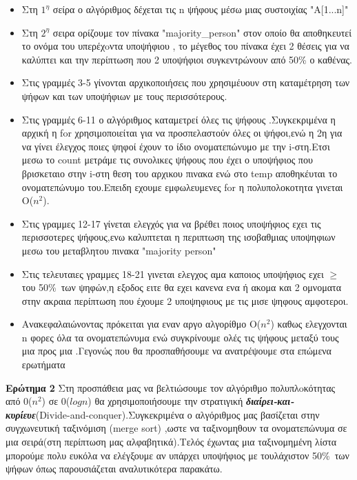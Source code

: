 \documentclass[a4paper, fleqn]{article}
\begin{document}
\begin{itemize}
    \item Στη $1^η$ σείρα ο αλγόριθμος δέχεται τις n ψήφους μέσω μιας συστοιχίας "A[1...n]"

    \item Στη $2^η$ σειρα ορίζουμε τον πίνακα "majority\_person" στον οποίο θα αποθηκευτεί  το ονόμα του υπερέχoντα υποψήφιου , το μέγεθος του πίνακα έχει 2 θέσεις για να καλύπτει και την περίπτωση που 2 υποψήφιοι συγκεντρώνουν από 50\% ο καθένας.

    \item Στις γραμμές 3-5 γίνονται αρχικοποιήσεις που χρησιμέυουν στη καταμέτρηση των ψήφων και των υποψήφιων με τους περισσότερους.

    \item Στις γραμμές 6-11 ο αλγόριθμος καταμετρεί όλες τις ψήφους .Συγκεκριμένα η αρχική η for χρησιμοποιείται για να προσπελαστούν όλες οι ψήφοι,ενώ η 2η για να γίνει έλεγχος ποιες ψηφοί έχουν το ίδιο ονοματεπώνυμο με την i-στη.Ετσι μεσω το count μετράμε τις συνολικες ψήφους που έχει ο υποψήφιος που βρισκεταιο στην i-στη θεση του αρχικου πινακα ενώ στο temp αποθηκέυται το ονοματεπώνυμο του.Eπειδη εχουμε εμφωλευμενες for η πολυπολοκοτητα γινεται Ο($n^2$).   

    \item Στις γραμμες 12-17 γίνεται  ελεγχός για να βρέθει  ποιος υποψήφιος εχει τις περισσοτερες ψήφους,ενω καλυπτεται η περιπτωση της ισοβαθμιας υποψηφιων μεσω του μεταβλητου πινακα "majority person"

    \item Στις τελευταιες γραμμες 18-21 γινεται ελεγχος αμα καποιος υποψήφιος εχει $\geq$ του 50\%\ των ψηφών,η εξοδος ειτε θα εχει κανενα ενα ή ακομα και 2 ομνοματα στην ακραια περίπτωση που έχουμε 2 υποψηφιους με τις μισε ψηφους αμφοτεροι.

    \item Aνακεφαλαιώνοντας πρόκειται για εναν αργο αλγορίθμο Ο($n^2$) καθως ελεγχονται n φορες όλα τα ονοματεπώνυμα ενώ συγκρίνουμε ολές τις ψήφους μεταξύ τους μια προς μια .Γεγονώς που θα προσπαθήσουμε να ανατρέψουμε στα επώμενα ερωτήματα   
\end{itemize}
\newpage

\textbf{
\color{red}Ερώτημα 2}
Στη προσπάθεια μας να βελτιώσουμε τον αλγόριθμο πολυπλoκότητας από 0($n^2$) σε 0($logn$) θα χρησιμοποιήσουμε την στρατιγική \textit{\textbf{διαίρει-και-κυρίευε}}(Divide-and-conquer).Συγκεκριμένα ο αλγόριθμος  μας βασίζεται στην συγχωνευτική ταξινόμιση (merge sort) ,ωστε να ταξινομηθουν τα ονοματεπώνυμα σε μια σειρά(στη περίπτωση μας αλφαβητικά).Τελός έχωντας μια ταξινομημένη λίστα μπορούμε πολυ ευκόλα να ελέγξουμε αν υπάρχει υποψήφιος με τουλάχιστον 50\%\ των ψήφων όπως παρουσιάζεται  αναλυτικότερα παρακάτω. 
\end{document}

